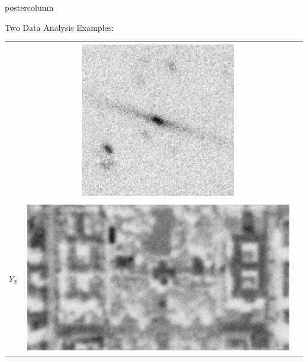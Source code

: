 \documentclass[final]{beamer}
\begin{document}
\begin{frame}
\begin{columns}
\begin{column}{.32\textwidth}
\begin{beamercolorbox}[center,wd=\textwidth]{postercolumn}
\begin{minipage}[T]{.95\textwidth}
{\begin{block}{Two Data Analysis Examples: }
\begin{table}
\begin{tabular}{c c c}
\begin{minipage}[c][2.5in][c]{6in}
                  \end{minipage} &
                  \begin{minipage}[c][2.5in][c]{5in}
                    \includegraphics[width=2.7in,trim = 120 50 120 50,clip]{./figures/galaxyPic2.eps}
                  \end{minipage} \\
                  \begin{minipage}[c][2.5in][c]{3cm}
                    $Y_2$
                  \end{minipage} &
                  \begin{minipage}[c][2.5in][c]{6in}
                    \includegraphics[width=5in,trim=80 130 80 90,clip]{./figures/satelliteBest.eps}
                  \end{minipage} &
                  \begin{minipage}[r][2.5in][r]{5in}

\end{minipage}
\end{tabular}
\end{table}
\end{block}}
\end{minipage}
\end{beamercolorbox}
\end{column}
\end{columns}
\end{frame}
\end{document}
